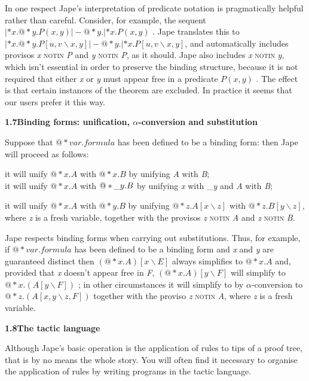 \documentclass[11pt]{book}
\newcommand{\tab}{\hspace{5mm}}
\begin{document}
In one respect Jape's interpretation of predicate notation is pragmatically helpful rather than careful. Consider, for example, the sequent $|*x.@*y.P(x,y) |- @*y.|*x.P(x,y)$ . Jape translates this to $|*x.@*y.P\left[ u,v\backslash x,y\right]  |- @*y.|*x.P\left[ u,v\backslash x,y\right] $, and automatically includes provisos \textit{x} \textsc{notin} \textit{P} and \textit{y} \textsc{notin} \textit{P}, as it should. Jape also includes \textit{x} \textsc{notin} \textit{y}, which isn't essential in order to preserve the binding structure, because it is not required that either \textit{x} or \textit{y} must appear free in a predicate $P(x,y)$ . The effect is that certain instances of the theorem are excluded. In practice it seems that our users prefer it this way.


\textbf{{\large 1.7\tab Binding forms: unification, \ensuremath{\alpha}-conversion and substitution}}


Suppose that $@*var.formula$ has been defined to be a binding form: then Jape will proceed as follows:


{\textbullet}\tab it will unify $@*x.A$ with $@*x.B$ by unifying \textit{A} with \textit{B};\\
{\textbullet}\tab it will unify $@*x.A$ with $@*\/\_{}y.B$ by unifying \textit{x} with \_\textit{y} and \textit{A} with \textit{B};


{\textbullet}\tab it will unify $@*x.A$ with $@*y.B$ by unifying $@*z.A[x\backslash z]$ with $@*z.B[y\backslash z]$, where \textit{z} is a fresh variable, together with the provisos \textit{z} \textsc{notin} \textit{A} and \textit{z} \textsc{notin} \textit{B}.


Jape respects binding forms when carrying out substitutions. Thus, for example, if $@*var.formula$ has been defined to be a binding form and \textit{x} and \textit{y} are guaranteed distinct then $(@*x.A)[x\backslash E]$ always simplifies to $@*x.A$ and, provided that \textit{x} doesn't appear free in \textit{F}, $(@*x.A)[y\backslash F]$ will simplify to $@*x.(A[y\backslash F])$ ; in other circumstances it will simplify to by \ensuremath{\alpha}-conversion to $@*z.(A[x,y\backslash z,F])$ together with the proviso \textit{z} \textsc{notin} \textit{A}, where \textit{z} is a fresh variable.


\textbf{{\large 1.8\tab The tactic language}}


Although Jape's basic operation is the application of rules to tips of a proof tree, that is by no means the whole story. You will often find it necessary to organise the application of rules by writing programs in the tactic language.
\end{document}
